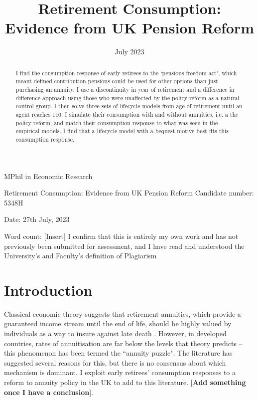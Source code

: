 \documentclass[12pt]{article}
\date{July 2023}
\title{Retirement Consumption: Evidence from UK Pension Reform}
\begin{document}
\begin{titlepage}
    \begin{center}

        \normalsize
        {MPhil in Economic Research}
        \vfill

        \huge
        Retirement Consumption: Evidence from UK Pension Reform
        \vfill
        \normalsize
        Candidate number: 5348H

        Date: 27th July, 2023

        Word count: [Insert]
        \vfill
        I confirm that this is entirely my own work and has not previously been submitted for assessment, and I have read and understood the University’s and Faculty’s definition of Plagiarism
    \end{center}
\end{titlepage}
\newpage
\maketitle
\begin{abstract}
    I find the consumption response of early retirees to the `pensions freedom
    act', which meant defined contribution pensions could be used for other
    options than just purchasing an annuity. I use a discontinuity in year of
    retirement and a difference in difference approach using those who were
    unaffected by the policy reform as a natural control group. I then solve
    three sets of lifecycle models from age of retirement until an agent reaches
    110. I simulate their consumption with and without annuities, i.e. a the
    policy reform, and match their consumption response to what was seen in the
    empirical models. I find that a lifecycle model with a bequest motive best
    fits this consumption response.
\end{abstract}
\newpage
\tableofcontents
\newpage

\section{Introduction}
Classical economic theory suggests that retirement annuities, which provide a
guaranteed income stream until the end of life, should be highly valued by
individuals as a way to insure against late death \citep{yaari_65}. However, in
developed countries, rates of annuitisation are far below the levels that theory
predicts -- this phenomenon has been termed the ``annuity puzzle". The literature
has suggested several reasons for this, but there is no consensus about which
mechanism is dominant. I exploit early retirees' consumption responses to a
reform to annuity policy in the UK to add to this literature. [\textbf{Add
            something once I have a conclusion}].
\end{document}
